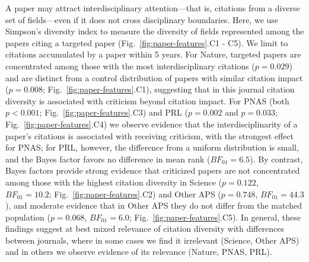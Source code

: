 \documentclass[12pt,a4paper]{article}
\numberwithin{equation}{section}
\begin{document}
A paper may attract interdisciplinary attention---that is, citations from a diverse set of fields---even if it does not cross disciplinary boundaries. 
Here, we use Simpson's diversity index to measure the diversity of fields represented among the papers citing a targeted paper (Fig.~\ref*{fig:paper-features}.C1 - C5).
We limit to citations accumulated by a paper within 5 years.
For Nature, targeted papers are concentrated among those with the most interdisciplinary citations ($p = 0.029$) and are distinct from a control distribution of papers with similar citation impact ($p = 0.008$; Fig.~\ref*{fig:paper-features}.C1), suggesting that in this journal citation diversity is associated with criticism beyond citation impact.
For PNAS (both $p < 0.001$; Fig.~\ref*{fig:paper-features}.C3) and PRL ($p = 0.002$ and $p = 0.033$; Fig.~\ref*{fig:paper-features}.C4) we observe evidence that the interdisciplinarity of a paper's citations is associated with receiving criticism, with the strongest effect for PNAS; for PRL, however, the difference from a uniform distribution is small, and the Bayes factor favors no difference in mean rank ($BF_{01} = 6.5$).
By contrast, Bayes factors provide strong evidence that criticized papers are not concentrated among those with the highest citation diversity in Science ($p = 0.122$, $BF_{01} = 10.2$; Fig.~\ref*{fig:paper-features}.C2) and Other APS ($p = 0.748$, $BF_{01} = 44.3$), and moderate evidence that in Other APS they do not differ from the matched population ($p = 0.068$, $BF_{01} = 6.0$; Fig.~\ref*{fig:paper-features}.C5).
In general, these findings suggest at best mixed relevance of citation diversity with differences between journals, where in some cases we find it irrelevant (Science, Other APS) and in others we observe evidence of its relevance (Nature, PNAS, PRL).
\end{document}
